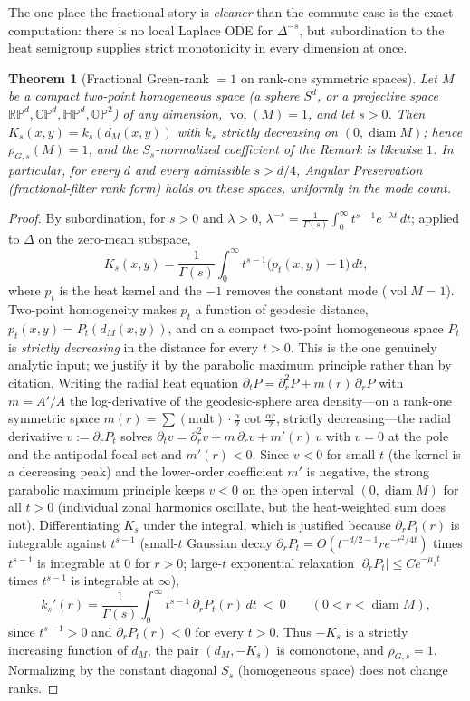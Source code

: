 \documentclass[11pt]{article}
\newtheorem{theorem}{Theorem}
\theoremstyle{remark}
\newcommand{\vol}{\operatorname{vol}}
\newcommand{\diam}{\operatorname{diam}}
\newcommand{\dM}{d_M}
\begin{document}
The one place the fractional story is \emph{cleaner} than the commute case is the exact
computation: there is no local Laplace ODE for $\Delta^{-s}$, but subordination to the heat
semigroup supplies strict monotonicity in every dimension at once.

\begin{theorem}[Fractional Green-rank $=1$ on rank-one symmetric spaces]\label{thm:twopoint}
Let $M$ be a compact two-point homogeneous space (a sphere $S^d$, or a projective space
$\mathbb{RP}^d,\mathbb{CP}^d,\mathbb{HP}^d,\mathbb{OP}^2$) of any dimension, $\vol(M)=1$, and
let $s>0$. Then $K_s(x,y)=k_s(\dM(x,y))$ with $k_s$ strictly decreasing on
$(0,\diam M)$; hence $\rho_{G,s}(M)=1$, and the $S_s$-normalized coefficient of the Remark
is likewise $1$. In particular, for every $d$ and every admissible $s>d/4$, Angular
Preservation (fractional-filter rank form) holds on these spaces, uniformly in the mode
count.
\end{theorem}

\begin{proof}
By subordination, for $s>0$ and $\lambda>0$, $\lambda^{-s}=\frac1{\Gamma(s)}\int_0^\infty
t^{s-1}e^{-\lambda t}\,dt$; applied to $\Delta$ on the zero-mean subspace,
\[
K_s(x,y)=\frac1{\Gamma(s)}\int_0^\infty t^{s-1}\bigl(p_t(x,y)-1\bigr)\,dt,
\]
where $p_t$ is the heat kernel and the $-1$ removes the constant mode ($\vol M=1$). Two-point
homogeneity makes $p_t$ a function of geodesic distance, $p_t(x,y)=P_t(\dM(x,y))$, and on a
compact two-point homogeneous space $P_t$ is \emph{strictly decreasing} in the distance for
every $t>0$. This is the one genuinely analytic input; we justify it by the parabolic maximum
principle rather than by citation. Writing the radial heat equation
$\partial_tP=\partial_r^2P+m(r)\,\partial_rP$ with $m=A'/A$ the log-derivative of the
geodesic-sphere area density---on a rank-one symmetric space
$m(r)=\sum(\mathrm{mult})\cdot\tfrac{\alpha}{2}\cot\tfrac{\alpha r}{2}$, strictly
decreasing---the radial derivative $v:=\partial_rP_t$ solves
$\partial_tv=\partial_r^2v+m\,\partial_rv+m'(r)\,v$ with $v=0$ at the pole and the antipodal
focal set and $m'(r)<0$. Since $v<0$ for small $t$ (the kernel is a decreasing peak) and the
lower-order coefficient $m'$ is negative, the strong parabolic maximum principle keeps $v<0$
on the open interval $(0,\diam M)$ for all $t>0$ (individual zonal harmonics oscillate, but
the heat-weighted sum does not). Differentiating $K_s$ under the integral,
which is justified because $\partial_r P_t(r)$ is integrable against $t^{s-1}$ (small-$t$
Gaussian decay $\partial_rP_t=O(t^{-d/2-1}re^{-r^2/4t})$ times $t^{s-1}$ is integrable at
$0$ for $r>0$; large-$t$ exponential relaxation $\lvert\partial_rP_t\rvert\le Ce^{-\mu_1 t}$
times $t^{s-1}$ is integrable at $\infty$),
\[
k_s'(r)=\frac1{\Gamma(s)}\int_0^\infty t^{s-1}\,\partial_r P_t(r)\,dt\ <\ 0
\qquad(0<r<\diam M),
\]
since $t^{s-1}>0$ and $\partial_rP_t(r)<0$ for every $t>0$. Thus $-K_s$ is a strictly
increasing function of $\dM$, the pair $(\dM,-K_s)$ is comonotone, and $\rho_{G,s}=1$.
Normalizing by the constant diagonal $S_s$ (homogeneous space) does not change ranks.
\end{proof}
\end{document}
